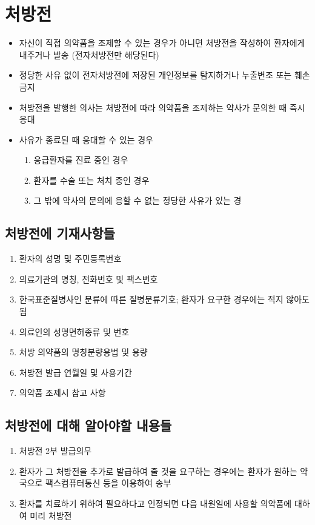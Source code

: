 ﻿\section{처방전}
\begin{shaded}
\begin{itemize}\tightlist
\item 자신이 직접 의약품을 조제할 수 있는 경우가 아니면 처방전을 작성하여 환자에게 내주거나 발송 (전자처방전만 해당된다)
\item 정당한 사유 없이 전자처방전에 저장된 개인정보를 탐지하거나 누출\cntrdot{}변조 또는 훼손 금지
\item 처방전을 발행한 의사는 처방전에 따라 의약품을 조제하는 약사가 문의한 때 즉시 응대
\item 사유가 종료된 때 응대할 수 있는 경우
	\begin{enumerate}\tightlist
	\item 응급환자를 진료 중인 경우
	\item 환자를 수술 또는 처치 중인 경우
	\item 그 밖에 약사의 문의에 응할 수 없는 정당한 사유가 있는 경
	\end{enumerate}
\end{itemize}
\end{shaded}
\subsection{처방전에 기재사항들}
\begin{enumerate}\tightlist
\item 환자의 성명 및 주민등록번호
\item 의료기관의 명칭, 전화번호 및 팩스번호
\item 한국표준질병\cntrdot{}사인 분류에 따른 질병분류기호; 환자가 요구한 경우에는 적지 않아도 됨
\item 의료인의 성명\cntrdot{}면허종류 및 번호
\item 처방 의약품의 명칭\cntrdot{}분량\cntrdot{}용법 및 용량
\item 처방전 발급 연월일 및 사용기간
\item 의약품 조제시 참고 사항
\end{enumerate}

\subsection{처방전에 대해 알아야할 내용들}
\begin{enumerate}\tightlist
\item 처방전 2부 발급의무 
\item 환자가 그 처방전을 추가로 발급하여 줄 것을 요구하는 경우에는 환자가 원하는 약국으로 팩스\cntrdot{}컴퓨터통신 등을 이용하여 송부
\item 환자를 치료하기 위하여 필요하다고 인정되면 다음 내원일에 사용할 의약품에 대하여 미리 처방전
\end{enumerate}